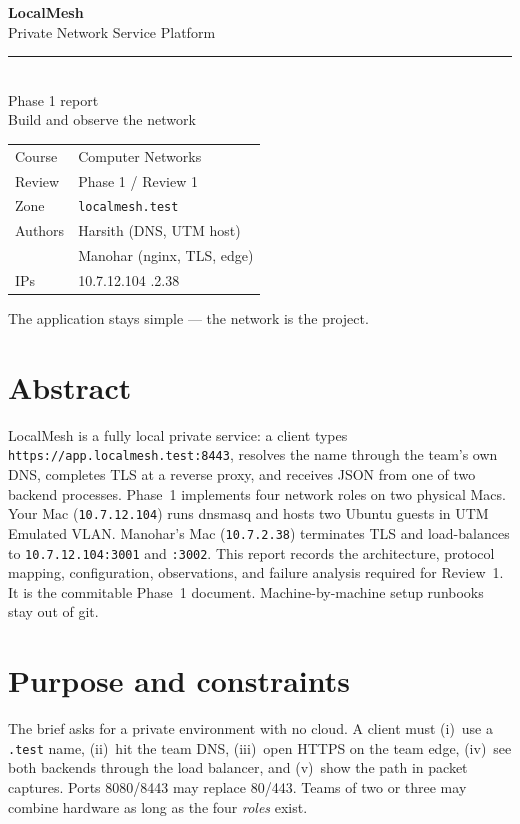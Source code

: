 \documentclass[11pt,a4paper]{article}
\begin{document}
\begin{titlepage}
\pagecolor{lmNavy}
\color{white}
\vspace*{1.6cm}
{\Huge\bfseries LocalMesh}\\[8pt]
{\LARGE Private Network Service Platform}\\[18pt]
{\color{lmTeal}\rule{4.2cm}{2.4pt}}\\[16pt]
{\Large Phase 1 report}\\[6pt]
{\large Build and observe the network}\\[2.4cm]
\begin{tabular}{@{}ll}
  \color{lmTeal} Course & \color{white} Computer Networks \\[4pt]
  \color{lmTeal} Review & \color{white} Phase 1 / Review 1 \\[4pt]
  \color{lmTeal} Zone & \color{white} \texttt{localmesh.test} \\[4pt]
  \color{lmTeal} Authors & \color{white} Harsith (DNS, UTM host) \\
                         & \color{white} Manohar (nginx, TLS, edge) \\[4pt]
  \color{lmTeal} IPs & \color{white} 10.7.12.104 \quad 10.7.2.38 \\
\end{tabular}
\vfill
{\small The application stays simple --- the network is the project.}
\end{titlepage}
\nopagecolor
\color{black}

\tableofcontents
\newpage

\section{Abstract}
LocalMesh is a fully local private service: a client types \texttt{https://app.localmesh.test:8443},
resolves the name through the team's own DNS, completes TLS at a reverse proxy, and receives JSON
from one of two backend processes. Phase~1 implements four network roles on two physical Macs.
Your Mac (\texttt{10.7.12.104}) runs dnsmasq and hosts two Ubuntu guests in UTM Emulated VLAN.
Manohar's Mac (\texttt{10.7.2.38}) terminates TLS and load-balances to
\texttt{10.7.12.104:3001} and \texttt{:3002}. This report records the architecture, protocol
mapping, configuration, observations, and failure analysis required for Review~1.
It is the commitable Phase~1 document. Machine-by-machine setup runbooks stay out of git.

\section{Purpose and constraints}
The brief asks for a private environment with no cloud. A client must (i)~use a \texttt{.test}
name, (ii)~hit the team DNS, (iii)~open HTTPS on the team edge, (iv)~see both backends through
the load balancer, and (v)~show the path in packet captures. Ports 8080/8443 may replace 80/443.
Teams of two or three may combine hardware as long as the four \emph{roles} exist.
\end{document}
